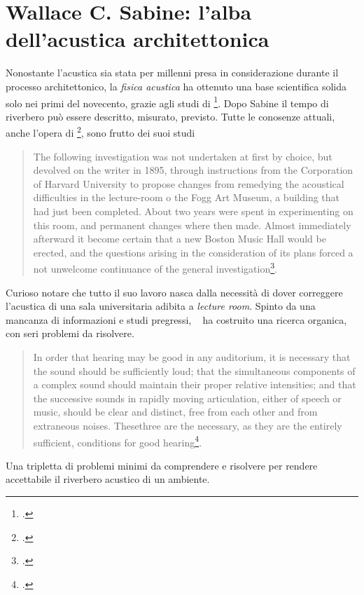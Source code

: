 \section{Wallace C. Sabine: l'alba dell'acustica architettonica}

Nonostante l'acustica sia stata per millenni presa in considerazione durante il
processo architettonico, la \emph{fisica acustica} ha ottenuto una base
scientifica solida solo nei primi del novecento, grazie agli studi di
\ws\footcite{ws:rev}. Dopo Sabine il tempo di riverbero può essere descritto,
misurato, previsto. Tutte le conosenze attuali, anche l'opera di
\ms\footcite{ms:rev62, ms:rev64}, sono frutto dei suoi studi

\begin{quote}
  The following investigation was not undertaken at first by choice, but devolved
  on the writer in 1895, through instructions from the Corporation of Harvard
  University to propose changes from remedying the acoustical difficulties in
  the lecture-room o the Fogg Art Museum, a building that had just been completed.
  About two years were spent in experimenting on this room, and permanent changes
  where then made. Almost immediately afterward it become certain that a new
  Boston Music Hall would be erected, and the questions arising in the
  consideration of its plans forced a not unwelcome continuance of the general
  investigation\footcite{ws:rev}.
\end{quote}

Curioso notare che tutto il suo lavoro nasca dalla necessità di dover correggere
l'acustica di una sala universitaria adibita a \emph{lecture room}.
Spinto da una mancanza di informazioni e studi pregressi, \ms~ ha costruito una
ricerca organica, con seri problemi da risolvere.

\begin{quote}
  In order that hearing may be good in any auditorium, it is necessary that the
  sound should be sufficiently loud; that the simultaneous components of a
  complex sound should maintain their proper relative intensities;
  and that the successive sounds in rapidly moving articulation, either of speech
  or music, should be clear and distinct, free from each other and from extraneous
  noises. Thesethree are the necessary, as they are the entirely sufficient,
  conditions for good hearing\footcite{ws:rev}.
\end{quote}

Una tripletta di problemi minimi da comprendere e risolvere per rendere accettabile
il riverbero acustico di un ambiente.

